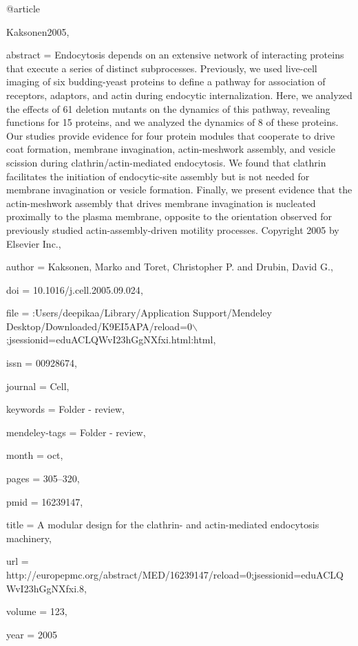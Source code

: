 @article{Kaksonen2005,

abstract = {Endocytosis depends on an extensive network of interacting proteins that execute a series of distinct subprocesses. Previously, we used live-cell imaging of six budding-yeast proteins to define a pathway for association of receptors, adaptors, and actin during endocytic internalization. Here, we analyzed the effects of 61 deletion mutants on the dynamics of this pathway, revealing functions for 15 proteins, and we analyzed the dynamics of 8 of these proteins. Our studies provide evidence for four protein modules that cooperate to drive coat formation, membrane invagination, actin-meshwork assembly, and vesicle scission during clathrin/actin-mediated endocytosis. We found that clathrin facilitates the initiation of endocytic-site assembly but is not needed for membrane invagination or vesicle formation. Finally, we present evidence that the actin-meshwork assembly that drives membrane invagination is nucleated proximally to the plasma membrane, opposite to the orientation observed for previously studied actin-assembly-driven motility processes. Copyright {\textcopyright}2005 by Elsevier Inc.},

author = {Kaksonen, Marko and Toret, Christopher P. and Drubin, David G.},

doi = {10.1016/j.cell.2005.09.024},

file = {:Users/deepikaa/Library/Application Support/Mendeley Desktop/Downloaded/K9EI5APA/reload=0$\backslash$;jsessionid=eduACLQWvI23hGgNXfxi.html:html},

issn = {00928674},

journal = {Cell},

keywords = {Folder - review},

mendeley-tags = {Folder - review},

month = {oct},

pages = {305--320},

pmid = {16239147},

title = {{A modular design for the clathrin- and actin-mediated endocytosis machinery}},

url = {http://europepmc.org/abstract/MED/16239147/reload=0;jsessionid=eduACLQWvI23hGgNXfxi.8},

volume = {123},

year = {2005}

}

